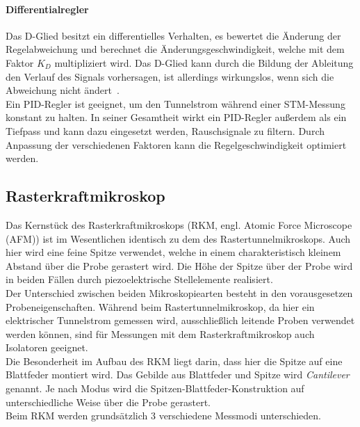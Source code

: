 \documentclass[a4paper,twoside,final]{article}
\begin{document}
\paragraph{Differentialregler} Das D-Glied besitzt ein differentielles Verhalten, es bewertet die Änderung der Regelabweichung und berechnet die Änderungsgeschwindigkeit, welche mit dem Faktor $K_D$ multipliziert wird. Das D-Glied kann durch die Bildung der Ableitung den Verlauf des Signals \glqq vorhersagen\grqq, ist allerdings wirkungslos, wenn sich die Abweichung nicht ändert~\cite{Forker}.\\
Ein PID-Regler ist geeignet, um den Tunnelstrom während einer STM-Messung konstant zu halten. In seiner Gesamtheit wirkt ein PID-Regler außerdem als ein Tiefpass und kann dazu eingesetzt werden, Rauschsignale zu filtern. Durch Anpassung der verschiedenen Faktoren kann die Regelgeschwindigkeit optimiert werden.
\subsection{Rasterkraftmikroskop}
Das Kernstück des Rasterkraftmikroskops (RKM, engl. Atomic Force Microscope (AFM)) ist im Wesentlichen identisch zu dem des Rastertunnelmikroskops. Auch hier wird eine feine Spitze verwendet, welche in einem charakteristisch kleinem Abstand über die Probe gerastert wird. Die Höhe der Spitze über der Probe wird in beiden Fällen durch piezoelektrische Stellelemente realisiert. \\
Der Unterschied zwischen beiden Mikroskopiearten besteht in den vorausgesetzen Probeneigenschaften. Während beim Rastertunnelmikroskop, da hier ein elektrischer Tunnelstrom gemessen wird, ausschließlich leitende Proben verwendet werden können, sind für Messungen mit dem Rasterkraftmikroskop auch Isolatoren geeignet.\\

Die Besonderheit im Aufbau des RKM liegt darin, dass hier die Spitze auf eine Blattfeder montiert wird. Das Gebilde aus Blattfeder und Spitze wird \textit{Cantilever} genannt. Je nach Modus wird die Spitzen-Blattfeder-Konstruktion auf unterschiedliche Weise über die Probe gerastert.\\
Beim RKM werden grundsätzlich 3 verschiedene Messmodi unterschieden.
\end{document}
